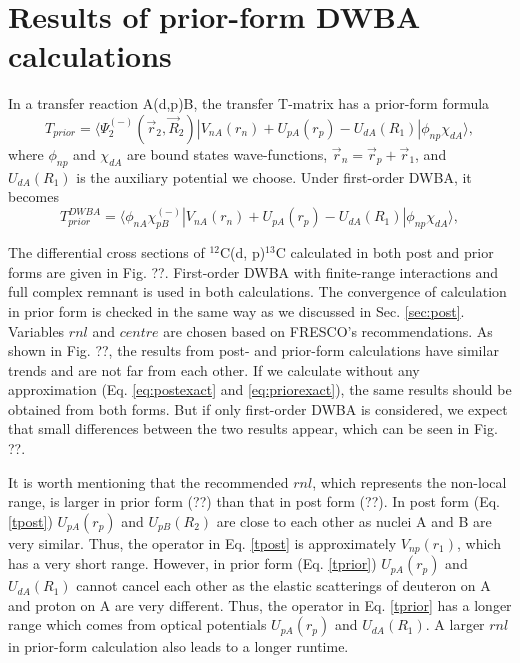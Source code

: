 \section{Results of prior-form DWBA calculations}
In a transfer reaction A(d,p)B, the transfer T-matrix has a prior-form formula \cite{thompson2009nuclear}
\begin{equation}\label{eq:priorexact}
T_{prior}=\langle\Psi_2^{(-)}(\vec{r}_2,\vec{R}_2)\left|V_{nA}(r_n)+U_{pA}(r_p)-U_{dA}(R_1)\right|\phi_{np}\chi_{dA}\rangle,
\end{equation}
where $\phi_{np}$ and $\chi_{dA}$ are bound states wave-functions, $\vec{r}_n=\vec{r}_p+\vec{r}_1$, 
and $U_{dA}(R_1)$ is the auxiliary potential we choose. 
Under first-order DWBA, it becomes
\begin{equation}\label{tprior}
T_{prior}^{DWBA}=\langle\phi_{nA}\chi_{pB}^{(-)}\left|V_{nA}(r_n)+U_{pA}(r_p)-U_{dA}(R_1)\right|\phi_{np}\chi_{dA}\rangle,
\end{equation}
\par
The differential cross sections of $^{12}$C(d, p)$^{13}$C calculated in both post and prior forms are given in Fig. ??. 
First-order DWBA with finite-range interactions and full complex remnant is used in both calculations. 
The convergence of calculation in prior form is checked in the same way as we discussed in Sec. \ref{sec:post}. 
Variables $rnl$ and $centre$ are chosen based on FRESCO's recommendations. 
As shown in Fig. ??, the results from post- and prior-form calculations have similar trends and are not far from each other. 
If we calculate without any approximation (Eq. \ref{eq:postexact} and \ref{eq:priorexact}), 
the same results should be obtained from both forms. 
But if only first-order DWBA is considered, we expect that small differences between the two results appear, 
which can be seen in Fig. ??. 
\par
It is worth mentioning that the recommended $rnl$, which represents the non-local range, is larger in prior form (??) than that in post form (??). 
In post form (Eq. \ref{tpost}) $U_{pA}(r_p)$ and $U_{pB}(R_2)$ are close to each other as nuclei A and B are very similar. 
Thus, the operator in Eq. \ref{tpost} is approximately $V_{np}(r_1)$, which has a very short range. 
However, in prior form (Eq. \ref{tprior}) $U_{pA}(r_p)$ and $U_{dA}(R_1)$ cannot cancel each other as the elastic scatterings of deuteron on A and proton on A are very different. 
Thus, the operator in Eq. \ref{tprior} has a longer range which comes from optical potentials $U_{pA}(r_p)$ and $U_{dA}(R_1)$. 
A larger $rnl$ in prior-form calculation also leads to a longer runtime. 